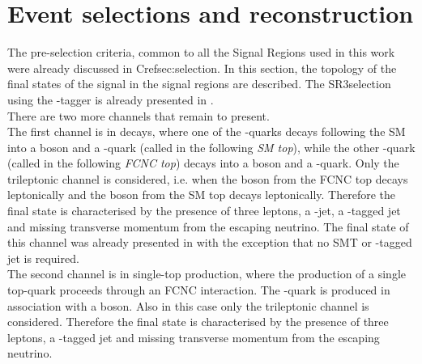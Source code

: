 \section{Event selections and reconstruction}
\label{sec:selection_all}
The pre-selection criteria, common to all the Signal Regions used in this work were already discussed in Cref{sec:selection}.
In this section, the topology of the final states of the signal in the signal regions are described. 
The SR3\tZc selection using the \Pqc-tagger \DLrc is already presented in .\\
There are two more channels that remain to present.
\vspace{\baselineskip}
\\The first channel is \FCNCtZc in \ttbar decays, where one of the \Pqt-quarks decays following the SM into a \PW boson and a
\Pqb-quark (called in the following \textit{SM top}), while the other
\Pqt-quark (called in the following \textit{FCNC top}) decays into a \PZ
boson and a \Pqc-quark. Only the
trileptonic channel is considered, i.e. when the \PZ boson from the
FCNC top decays leptonically and the \PW boson from the SM top
decays leptonically. Therefore the final state is characterised by
the presence of three leptons, a \Pqc-jet, a \Pqb-tagged jet and missing
transverse momentum from the escaping neutrino.  
The final state of this channel was already presented in   with the exception that no SMT or \Pqc-tagged jet is required.
\vspace{\baselineskip}
\\The second channel is \FCNCtZc in single-top production, where the
production of a single top-quark proceeds through an FCNC
interaction. The \Pqt-quark is produced in association with a \PZ
boson. Also in this case only the trileptonic channel is
considered. Therefore the final state is characterised by
the presence of three leptons, a \Pqb-tagged jet and missing
transverse momentum from the escaping neutrino. 


